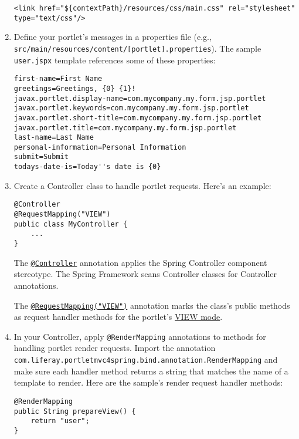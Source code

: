 \begin{enumerate}
\begin{verbatim}
<link href="${contextPath}/resources/css/main.css" rel="stylesheet" type="text/css"/>
\end{verbatim}
\item
  Define your portlet's messages in a properties file (e.g.,
  \texttt{src/main/resources/content/{[}portlet{]}.properties}). The
  sample \texttt{user.jspx} template references some of these
  properties:

\begin{verbatim}
first-name=First Name
greetings=Greetings, {0} {1}!
javax.portlet.display-name=com.mycompany.my.form.jsp.portlet
javax.portlet.keywords=com.mycompany.my.form.jsp.portlet
javax.portlet.short-title=com.mycompany.my.form.jsp.portlet
javax.portlet.title=com.mycompany.my.form.jsp.portlet
last-name=Last Name
personal-information=Personal Information
submit=Submit
todays-date-is=Today''s date is {0}
\end{verbatim}
\item
  Create a Controller class to handle portlet requests. Here's an
  example:

\begin{verbatim}
@Controller
@RequestMapping("VIEW")
public class MyController {
    ...
}
\end{verbatim}

  The
  \href{https://docs.spring.io/spring/docs/current/javadoc-api/org/springframework/stereotype/Controller.html}{\texttt{@Controller}}
  annotation applies the Spring Controller component stereotype. The
  Spring Framework scans Controller classes for Controller annotations.

  The
  \href{https://docs.spring.io/spring/docs/current/javadoc-api/org/springframework/web/bind/annotation/RequestMapping.html}{\texttt{@RequestMapping("VIEW")}}
  annotation marks the class's public methods as request handler methods
  for the portlet's
  \href{/docs/7-2/frameworks/-/knowledge_base/f/portlets}{VIEW mode}.
\item
  In your Controller, apply \texttt{@RenderMapping} annotations to
  methods for handling portlet render requests. Import the annotation
  \texttt{com.liferay.portletmvc4spring.bind.annotation.RenderMapping}
  and make sure each handler method returns a string that matches the
  name of a template to render. Here are the sample's render request
  handler methods:

\begin{verbatim}
@RenderMapping
public String prepareView() {
    return "user";
}


\end{verbatim}
\end{enumerate}
